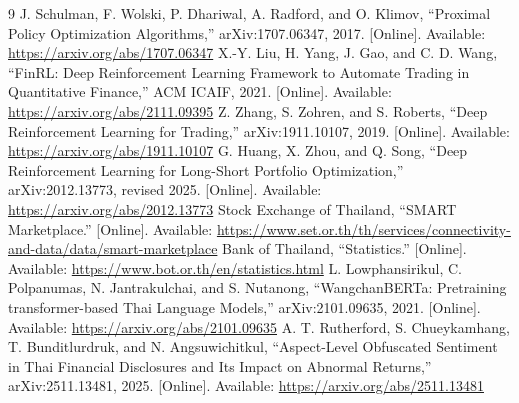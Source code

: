 \documentclass[11pt]{article}
\begin{document}
\begin{thebibliography}{9}
 J. Schulman, F. Wolski, P. Dhariwal, A. Radford, and O. Klimov, ``Proximal Policy Optimization Algorithms,'' arXiv:1707.06347, 2017. [Online]. Available: \url{https://arxiv.org/abs/1707.06347}
 X.-Y. Liu, H. Yang, J. Gao, and C. D. Wang, ``FinRL: Deep Reinforcement Learning Framework to Automate Trading in Quantitative Finance,'' ACM ICAIF, 2021. [Online]. Available: \url{https://arxiv.org/abs/2111.09395}
 Z. Zhang, S. Zohren, and S. Roberts, ``Deep Reinforcement Learning for Trading,'' arXiv:1911.10107, 2019. [Online]. Available: \url{https://arxiv.org/abs/1911.10107}
 G. Huang, X. Zhou, and Q. Song, ``Deep Reinforcement Learning for Long-Short Portfolio Optimization,'' arXiv:2012.13773, revised 2025. [Online]. Available: \url{https://arxiv.org/abs/2012.13773}
 Stock Exchange of Thailand, ``SMART Marketplace.'' [Online]. Available: \url{https://www.set.or.th/th/services/connectivity-and-data/data/smart-marketplace}
 Bank of Thailand, ``Statistics.'' [Online]. Available: \url{https://www.bot.or.th/en/statistics.html}
 L. Lowphansirikul, C. Polpanumas, N. Jantrakulchai, and S. Nutanong, ``WangchanBERTa: Pretraining transformer-based Thai Language Models,'' arXiv:2101.09635, 2021. [Online]. Available: \url{https://arxiv.org/abs/2101.09635}
 A. T. Rutherford, S. Chueykamhang, T. Bunditlurdruk, and N. Angsuwichitkul, ``Aspect-Level Obfuscated Sentiment in Thai Financial Disclosures and Its Impact on Abnormal Returns,'' arXiv:2511.13481, 2025. [Online]. Available: \url{https://arxiv.org/abs/2511.13481}
\end{thebibliography}
\end{document}
